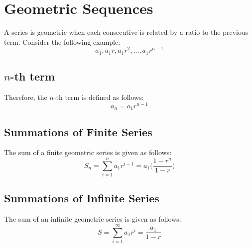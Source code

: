\section{Geometric Sequences}
A series is geometric when each consecutive is related by a ratio to the
previous term.  Consider the following example:
\begin{equation}
  a_1,a_1r,a_1r^2,...,a_1r^{n-1}
\end{equation}

\subsection{$n$-th term}
Therefore, the $n$-th term is defined as follows:
\begin{equation}
  a_n=a_1r^{n-1}
\end{equation}

\subsection{Summations of Finite Series}
The sum of a finite geometric series is given as follows:
\begin{equation}
  S_n=\sum_{i=1}^{n}a_1r^{i-1}=a_1\Big(\frac{1-r^n}{1-r}\Big)
\end{equation}

\subsection{Summations of Infinite Series}
The sum of an infinite geometric series is given as follows:
\begin{equation}
  S=\sum_{i=1}^{\infty}a_1r^i=\frac{a_1}{1-r}
\end{equation}
